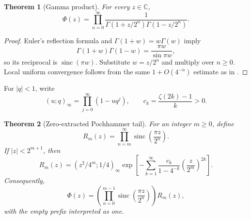 \documentclass[11pt,oneside]{article}
\numberwithin{equation}{section}
\newtheorem{theorem}{Theorem}[section]
\theoremstyle{definition}
\theoremstyle{remark}
\newcommand{\C}{\mathbb C}
\newcommand{\abs}[1]{\left|#1\right|}
\newcommand{\sinc}{\operatorname{sinc}}
\newcommand{\PhiUp}{\Phi}
\newcommand{\qpoch}[2]{\left(#1;#2\right)_{\!\infty}}
\begin{document}
\begin{theorem}[Gamma product]
\label{thm:gamma-product}
For every \(z\in\C\),
\begin{equation}
 \PhiUp(z)=\prod_{n=0}^{\infty}
 \frac{1}{\Gamma(1+z/2^n)\Gamma(1-z/2^n)}.
 \label{eq:gamma-product}
\end{equation}
\end{theorem}

\begin{proof}
Euler's reflection formula and \(\Gamma(1+w)=w\Gamma(w)\) imply
\[
 \Gamma(1+w)\Gamma(1-w)=\frac{\pi w}{\sin\pi w},
\]
so its reciprocal is \(\sinc(\pi w)\).  Substitute \(w=z/2^n\) and multiply over
\(n\ge0\).  Local uniform convergence follows from the same \(1+O(4^{-n})\) estimate as in
.
\end{proof}

For \(\abs q<1\), write
\[
 (u;q)_\infty=\prod_{j=0}^{\infty}(1-uq^j),
 \qquad
 c_k=\frac{\zeta(2k)-1}{k}>0.
\]

\begin{theorem}[Zero-extracted Pochhammer tail]
\label{thm:pochhammer-tail}
For an integer \(m\ge0\), define
\[
 R_m(z)=\prod_{n=m}^{\infty}\sinc\!\left(\frac{\pi z}{2^n}\right).
\]
If \(\abs z<2^{m+1}\), then
\begin{equation}
 \boxed{
 R_m(z)
 =\qpoch{z^2/4^m}{1/4}
 \exp\!\left[-\sum_{k=1}^{\infty}
  \frac{c_k}{1-4^{-k}}\left(\frac{z}{2^m}\right)^{2k}\right].}
 \label{eq:pochhammer-tail}
\end{equation}
Consequently,
\begin{equation}
 \PhiUp(z)=\left(\prod_{n=0}^{m-1}
 \sinc\!\left(\frac{\pi z}{2^n}\right)\right)R_m(z),
 \label{eq:prefix-tail}
\end{equation}
with the empty prefix interpreted as one.
\end{theorem}
\end{document}
